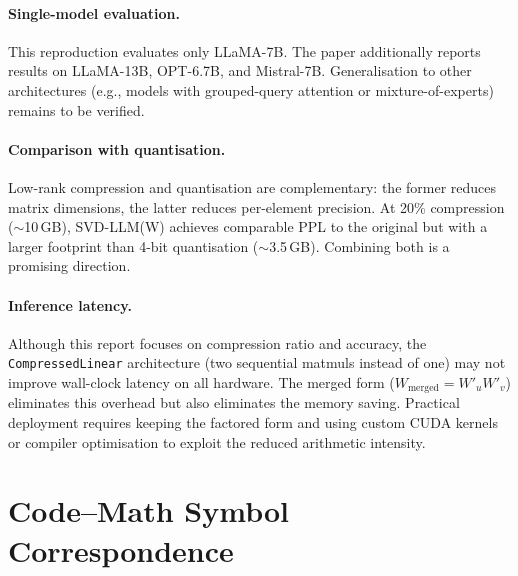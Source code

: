 \documentclass[11pt,a4paper]{article}
\theoremstyle{remark}
\begin{document}
\paragraph{Single-model evaluation.}
This reproduction evaluates only LLaMA-7B.  The paper additionally reports
results on LLaMA-13B, OPT-6.7B, and Mistral-7B.  Generalisation to other
architectures (e.g., models with grouped-query attention or mixture-of-experts)
remains to be verified.

\paragraph{Comparison with quantisation.}
Low-rank compression and quantisation are complementary: the former
reduces matrix dimensions, the latter reduces per-element precision.
At 20\% compression (${\sim}$10\,GB), SVD-LLM(W) achieves comparable
PPL to the original but with a larger footprint than 4-bit quantisation
(${\sim}$3.5\,GB).  Combining both is a promising direction.

\paragraph{Inference latency.}
Although this report focuses on compression ratio and accuracy, the
\texttt{CompressedLinear} architecture (two sequential matmuls instead of one)
may not improve wall-clock latency on all hardware.  The merged form
($W_{\text{merged}} = W'_u W'_v$) eliminates this overhead but also eliminates
the memory saving.  Practical deployment requires keeping the factored form and
using custom CUDA kernels or compiler optimisation to exploit the reduced
arithmetic intensity.

\section{Code--Math Symbol Correspondence}
\label{sec:appendix}
\end{document}
